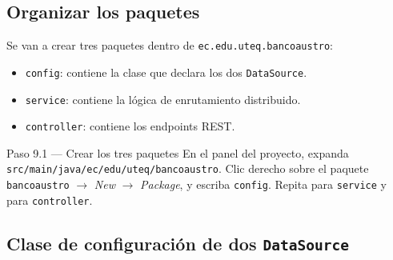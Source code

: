 \documentclass[11pt,a4paper]{article}
\begin{document}
\subsection{Organizar los paquetes}

Se van a crear tres paquetes dentro de \texttt{ec.edu.uteq.bancoaustro}:

\begin{itemize}[leftmargin=1.2em]
    \item \texttt{config}: contiene la clase que declara los dos \texttt{DataSource}.
    \item \texttt{service}: contiene la l\'ogica de enrutamiento distribuido.
    \item \texttt{controller}: contiene los endpoints REST.
\end{itemize}

\begin{pasobox}{Paso 9.1 --- Crear los tres paquetes}
En el panel del proyecto, expanda \texttt{src/main/java/ec/edu/uteq/bancoaustro}. Clic derecho sobre el paquete \texttt{bancoaustro} $\rightarrow$ \emph{New} $\rightarrow$ \emph{Package}, y escriba \texttt{config}. Repita para \texttt{service} y para \texttt{controller}.
\end{pasobox}

\subsection{Clase de configuraci\'on de dos \texttt{DataSource}}
\end{document}
